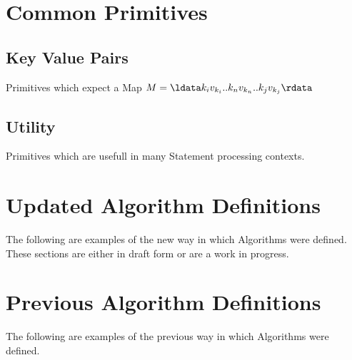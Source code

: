 \documentclass{article}
\begin{document}
\section{Common Primitives}


\subsection{Key Value Pairs}
Primitives which expect a Map $M = \ldata k_{i}v_{k_{i}}..k_{n}v_{k_{n}}..k_{j}v_{k_{j}} \rdata$


\subsection{Utility}
Primitives which are usefull in many Statement processing contexts.



\section*{Updated Algorithm Definitions}
The following are examples of the new way in which Algorithms were defined. These sections are either in draft form or are a work in progress.





\section*{Previous Algorithm Definitions}
The following are examples of the previous way in which Algorithms were defined.






\end{document}
